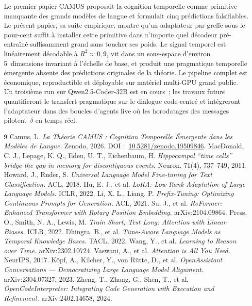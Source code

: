 \documentclass[10pt,twocolumn,letterpaper]{article}
\begin{document}
Le premier papier CAMUS proposait la cognition temporelle comme primitive manquante des grands modèles de langue et formulait cinq prédictions falsifiables. Le présent papier, sa suite empirique, montre qu'un adaptateur par greffe sous le pour-cent suffit à installer cette primitive dans n'importe quel décodeur pré-entraîné suffisamment grand sans toucher ses poids. Le signal temporel est linéairement décodable à $R^2 \approx 0{,}9$, vit dans un sous-espace d'environ 5~dimensions invariant à l'échelle de base, et produit une pragmatique temporelle émergente absente des prédictions originales de la théorie. Le pipeline complet est économique, reproductible et déployable sur matériel multi-GPU grand public. Un troisième run sur Qwen2.5-Coder-32B est en cours~; les travaux futurs quantifieront le transfert pragmatique sur le dialogue code-centré et intégreront l'adaptateur dans des boucles d'agents live où les horodatages des messages pilotent~$\delta$ en temps réel.

\begin{thebibliography}{9}
\footnotesize
{} Camus, L. \emph{La Théorie CAMUS : Cognition Temporelle Émergente dans les Modèles de Langue.} Zenodo, 2026. DOI :~\href{https://doi.org/10.5281/zenodo.19509846}{10.5281/zenodo.19509846}.
 MacDonald, C. J., Lepage, K. Q., Eden, U. T., Eichenbaum, H. \emph{Hippocampal ``time cells'' bridge the gap in memory for discontiguous events.} Neuron, 71(4), 737--749, 2011.
 Howard, J., Ruder, S. \emph{Universal Language Model Fine-tuning for Text Classification.} ACL, 2018.
 Hu, E. J., et al. \emph{LoRA: Low-Rank Adaptation of Large Language Models.} ICLR, 2022.
 Li, X. L., Liang, P. \emph{Prefix-Tuning: Optimizing Continuous Prompts for Generation.} ACL, 2021.
 Su, J., et al. \emph{RoFormer: Enhanced Transformer with Rotary Position Embedding.} arXiv:2104.09864.
 Press, O., Smith, N. A., Lewis, M. \emph{Train Short, Test Long: Attention with Linear Biases.} ICLR, 2022.
 Dhingra, B., et al. \emph{Time-Aware Language Models as Temporal Knowledge Bases.} TACL, 2022.
 Wang, Y., et al. \emph{Learning to Reason over Time.} arXiv:2302.10724.
 Vaswani, A., et al. \emph{Attention is All You Need.} NeurIPS, 2017.
 K\"opf, A., Kilcher, Y., von R\"utte, D., et al. \emph{OpenAssistant Conversations --- Democratizing Large Language Model Alignment.} arXiv:2304.07327, 2023.
 Zheng, T., Zhang, G., Shen, T., et al. \emph{OpenCodeInterpreter: Integrating Code Generation with Execution and Refinement.} arXiv:2402.14658, 2024.
\end{thebibliography}
\end{document}
